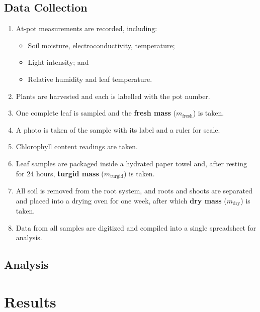 \documentclass{report}
\begin{document}
\subsection{Data Collection}

\begin{enumerate}
    \item At-pot measurements are recorded, including:
    \begin{itemize}
        \item Soil moisture, electroconductivity, temperature;
        \item Light intensity; and
        \item Relative humidity and leaf temperature.
    \end{itemize}
    \item Plants are harvested and each is labelled with the pot number.
    \item One complete leaf is sampled and the \textbf{fresh mass} ($m_{\text{fresh}}$) is taken.
    \item A photo is taken of the sample with its label and a ruler for scale.
    \item Chlorophyll content readings are taken.
    \item Leaf samples are packaged inside a hydrated paper towel and, after resting for 24 hours, \textbf{turgid mass} ($m_{\text{turgid}}$) is taken.
    \item All soil is removed from the root system, and roots and shoots are separated and placed into a drying oven for one week, after which \textbf{dry mass} ($m_{\text{dry}}$) is taken.
    \item Data from all samples are digitized and compiled into a single spreadsheet for analysis.
\end{enumerate}

\clearpage

\subsection{Analysis}

\section{Results}

\end{document}
